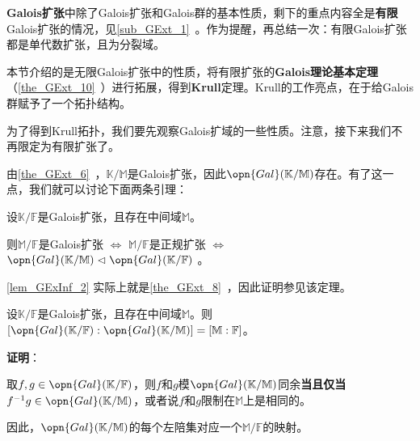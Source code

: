 


\textbf{Galois扩张}中除了Galois扩张和Galois群的基本性质，剩下的重点内容全是\textbf{有限}Galois扩张的情况，见\autoref{sub_GExt_1}~。作为提醒，再总结一次：有限Galois扩张都是单代数扩张，且为分裂域。

本节介绍的是无限Galois扩张中的性质，将有限扩张的\textbf{Galois理论基本定理}（\autoref{the_GExt_10}~）进行拓展，得到\textbf{Krull}定理。Krull的工作亮点，在于给Galois群赋予了一个拓扑结构。


为了得到Krull拓扑，我们要先观察Galois扩域的一些性质。注意，接下来我们不再限定为有限扩张了。


由\autoref{the_GExt_6}~，$\mathbb{K}/\mathbb{M}$是Galois扩张，因此$\opn{Gal}(\mathbb{K}/\mathbb{M})$存在。有了这一点，我们就可以讨论下面两条引理：

\begin{lemma}{}\label{lem_GExInf_2}
设$\mathbb{K}/\mathbb{F}$是Galois扩张，且存在中间域$\mathbb{M}$。

则$\mathbb{M}/\mathbb{F}$是Galois扩张 $\iff$ $\mathbb{M}/\mathbb{F}$是正规扩张 $\iff$ $\opn{Gal}(\mathbb{K}/\mathbb{M})\vartriangleleft \opn{Gal}(\mathbb{K}/\mathbb{F})$ 。
\end{lemma}

\autoref{lem_GExInf_2} 实际上就是\autoref{the_GExt_8}~，因此证明参见该定理。


\begin{lemma}{}\label{lem_GExInf_1}
设$\mathbb{K}/\mathbb{F}$是Galois扩张，且存在中间域$\mathbb{M}$。则$[\opn{Gal}(\mathbb{K}/\mathbb{F}):\opn{Gal}(\mathbb{K}/\mathbb{M})]=[\mathbb{M}:\mathbb{F}]$。


\end{lemma}


\textbf{证明}：

取$f, g\in\opn{Gal}(\mathbb{K}/\mathbb{F})$，则$f$和$g$模$\opn{Gal}(\mathbb{K}/\mathbb{M})$同余\textbf{当且仅当}$f^{-1}g\in\opn{Gal}(\mathbb{K}/\mathbb{M})$，或者说$f$和$g$限制在$\mathbb{M}$上是相同的。

因此，$\opn{Gal}(\mathbb{K}/\mathbb{M})$的每个左陪集对应一个$\mathbb{M}/\mathbb{F}$的映射。

